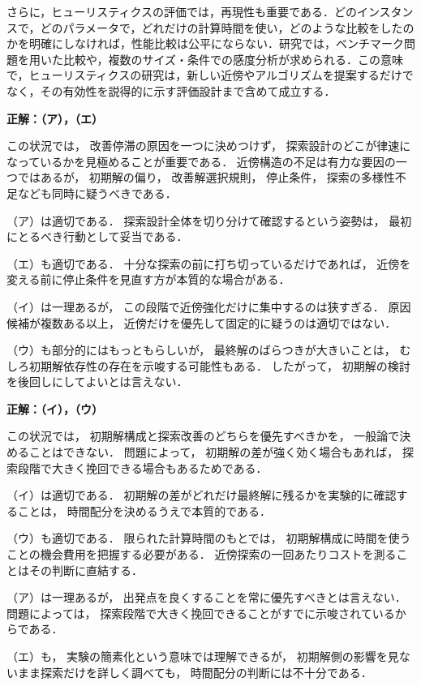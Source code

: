 さらに，ヒューリスティクスの評価では，再現性も重要である．どのインスタンスで，どのパラメータで，どれだけの計算時間を使い，どのような比較をしたのかを明確にしなければ，性能比較は公平にならない．研究では，ベンチマーク問題を用いた比較や，複数のサイズ・条件での感度分析が求められる．この意味で，ヒューリスティクスの研究は，新しい近傍やアルゴリズムを提案するだけでなく，その有効性を説得的に示す評価設計まで含めて成立する．


\begin{example}[title={クイズ7 正解・解説}]
\label{ans:heu-multi1-var}
\textbf{正解：（ア），（エ）}

この状況では，
改善停滞の原因を一つに決めつけず，
探索設計のどこが律速になっているかを見極めることが重要である．
近傍構造の不足は有力な要因の一つではあるが，
初期解の偏り，
改善解選択規則，
停止条件，
探索の多様性不足なども同時に疑うべきである．

（ア）は適切である．
探索設計全体を切り分けて確認するという姿勢は，
最初にとるべき行動として妥当である．

（エ）も適切である．
十分な探索の前に打ち切っているだけであれば，
近傍を変える前に停止条件を見直す方が本質的な場合がある．

（イ）は一理あるが，
この段階で近傍強化だけに集中するのは狭すぎる．
原因候補が複数ある以上，
近傍だけを優先して固定的に疑うのは適切ではない．

（ウ）も部分的にはもっともらしいが，
最終解のばらつきが大きいことは，
むしろ初期解依存性の存在を示唆する可能性もある．
したがって，
初期解の検討を後回しにしてよいとは言えない．

\end{example}

\begin{example}[title={クイズ8 正解・解説}]
\label{ans:heu-multi2-var}
\textbf{正解：（イ），（ウ）}

この状況では，
初期解構成と探索改善のどちらを優先すべきかを，
一般論で決めることはできない．
問題によって，
初期解の差が強く効く場合もあれば，
探索段階で大きく挽回できる場合もあるためである．

（イ）は適切である．
初期解の差がどれだけ最終解に残るかを実験的に確認することは，
時間配分を決めるうえで本質的である．

（ウ）も適切である．
限られた計算時間のもとでは，
初期解構成に時間を使うことの機会費用を把握する必要がある．
近傍探索の一回あたりコストを測ることはその判断に直結する．

（ア）は一理あるが，
出発点を良くすることを常に優先すべきとは言えない．
問題によっては，
探索段階で大きく挽回できることがすでに示唆されているからである．

（エ）も，
実験の簡素化という意味では理解できるが，
初期解側の影響を見ないまま探索だけを詳しく調べても，
時間配分の判断には不十分である．

\end{example}

